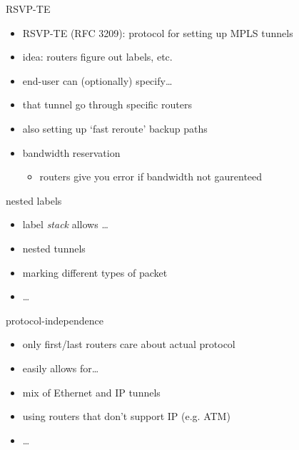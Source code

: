 \begin{frame}{RSVP-TE}
    \begin{itemize}
    \item RSVP-TE (RFC 3209): protocol for setting up MPLS tunnels
    \item idea: routers figure out labels, etc.
    \item end-user can (optionally) specify\ldots
    \vspace{.5cm}
    \item that tunnel go through specific routers
    \item also setting up `fast reroute' backup paths
    \item bandwidth reservation 
        \begin{itemize}
        \item routers give you error if bandwidth not gaurenteed
        \end{itemize}
    \end{itemize}
\end{frame}

\begin{frame}{nested labels}
    \begin{itemize}
    \item label \textit{stack} allows \ldots
    \item nested tunnels
    \item marking different types of packet
    \item \ldots
    \end{itemize}
\end{frame}

\begin{frame}{protocol-independence}
    \begin{itemize}
    \item only first/last routers care about actual protocol
    \item easily allows for\ldots
    \vspace{.5cm}
    \item mix of Ethernet and IP tunnels
    \item using routers that don't support IP (e.g. ATM)
    \item \ldots
    \end{itemize}
\end{frame}

